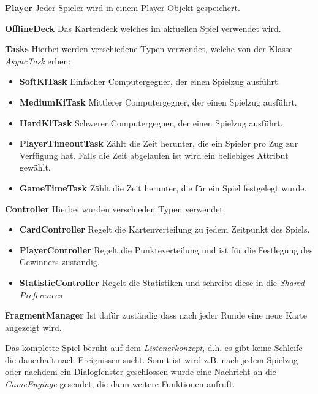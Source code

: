 \begin{itemize}
\item{\textbf{Player}\quad 
Jeder Spieler wird in einem Player-Objekt gespeichert.
}
\item{\textbf{OfflineDeck}\quad
Das Kartendeck welches im aktuellen Spiel verwendet wird.
}
\item{\textbf{Tasks}\quad
Hierbei werden verschiedene Typen verwendet, welche von der Klasse \emph{AsyncTask} erben:
	\begin{itemize}
	\item{\textbf{SoftKiTask}\quad
	Einfacher Computergegner, der einen Spielzug ausführt.
	}
	\item{\textbf{MediumKiTask}\quad
	Mittlerer Computergegner, der einen Spielzug ausführt.	
	}
	\item{\textbf{HardKiTask}\quad
	Schwerer Computergegner, der einen Spielzug ausführt.
	}
	\item{\textbf{PlayerTimeoutTask}\quad
	Zählt die Zeit herunter, die ein Spieler pro Zug zur Verfügung hat. Falls die Zeit abgelaufen ist wird ein beliebiges Attribut gewählt.
	}
	\item{\textbf{GameTimeTask}\quad
	Zählt die Zeit herunter, die für ein Spiel festgelegt wurde.
	}
	\end{itemize}
\item{\textbf{Controller}\quad
Hierbei wurden verschieden Typen verwendet:
	\begin{itemize}
	\item{\textbf{CardController}\quad
	Regelt die Kartenverteilung zu jedem Zeitpunkt des Spiels. 
	}
	\item{\textbf{PlayerController}\quad
	Regelt die Punkteverteilung und ist für die Festlegung des Gewinners zuständig.
	}
	\item{\textbf{StatisticController}\quad
	Regelt die Statistiken und schreibt diese in die \emph{Shared Preferences}
	}
	\end{itemize}
}
\item{\textbf{FragmentManager}\quad
Ist dafür zuständig dass nach jeder Runde eine neue Karte angezeigt wird.
}
}
\end{itemize}

Das komplette Spiel beruht auf dem \emph{Listenerkonzept}, d.h. es gibt keine Schleife die dauerhaft nach Ereignissen sucht. Somit ist wird z.B. nach jedem Spielzug oder nachdem ein Dialogfenster geschlossen wurde eine Nachricht an die \emph{GameEnginge} gesendet, die dann weitere Funktionen aufruft.


